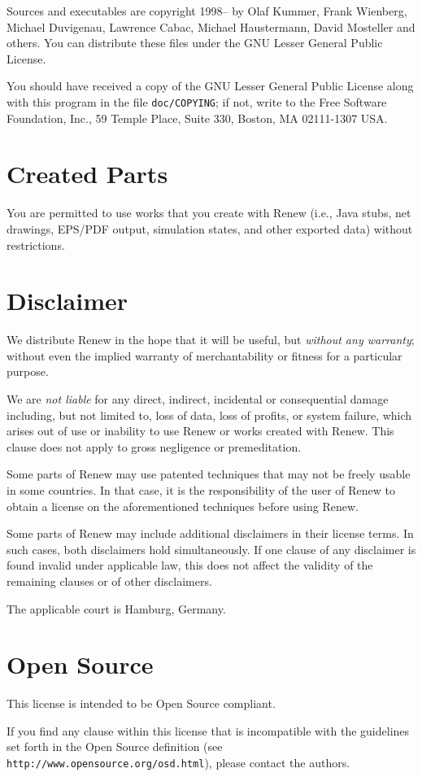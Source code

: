Sources and executables are copyright 1998--\renewyear{} by Olaf
Kummer, Frank Wienberg, Michael Duvigenau, Lawrence Cabac, Michael
Haustermann, David Mosteller and others.  You can distribute these
files under the GNU Lesser General Public License.

You should have received a copy of the GNU Lesser General Public License
along with this program in the file \texttt{doc/COPYING}; if not, write to
the Free Software Foundation, Inc., 59 Temple Place, Suite 330, Boston,
MA 02111-1307 USA.


\section{Created Parts}

You are permitted to use works that you create with Renew (i.e., Java
stubs, net drawings, EPS/PDF output, simulation states, and other
exported data) without restrictions.


\section{Disclaimer}

We distribute Renew in the hope that it will be useful, but \emph{without 
any warranty}; without even the implied warranty of merchantability or 
fitness for a particular purpose.

We are \emph{not liable} for any direct, indirect, incidental or 
consequential damage including, but not limited to, loss of data, loss 
of profits, or system failure, which arises out of use or inability to
use Renew or works created with Renew. This clause does not apply to 
gross negligence or premeditation.

Some parts of Renew may use patented techniques that may not be freely 
usable in some countries. In that case, it is the responsibility of the 
user of Renew to obtain a license on the aforementioned techniques 
before using Renew.

Some parts of Renew may include additional disclaimers in their license 
terms. In such cases, both disclaimers hold simultaneously. If one
clause of any disclaimer is found invalid under applicable law, this 
does not affect the validity of the remaining clauses or of other 
disclaimers.

The applicable court is Hamburg, Germany.


\section{Open Source}

This license is intended to be Open Source compliant. 

If you find any clause within this license that is incompatible with 
the guidelines set forth in the Open Source definition (see 
\texttt{http://www.opensource.org/osd.html}), please contact the authors.


